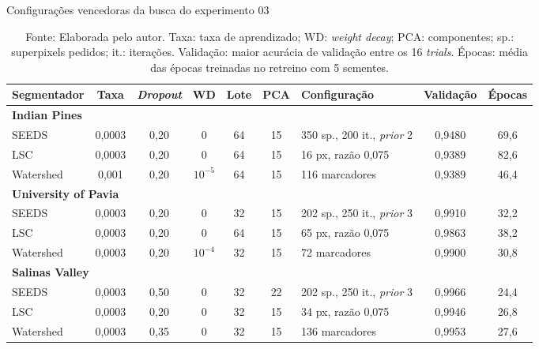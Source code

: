 \begin{table}[!htb]
    \centering
    \footnotesize
    \setlength{\tabcolsep}{3pt}
    \caption{Configurações vencedoras da busca do experimento 03}
    \begin{tabular}{|l|c|c|c|c|c|l|c|c|}
        \hline
        \rowcolor[HTML]{C0C0C0}
        \textbf{Segmentador} & \textbf{Taxa} & \textbf{\textit{Dropout}} & \textbf{WD} & \textbf{Lote} & \textbf{PCA} & \textbf{Configuração} & \textbf{Validação} & \textbf{Épocas} \\
        \hline
        \multicolumn{9}{|l|}{\cellcolor[HTML]{EFEFEF}\textbf{Indian Pines}} \\ \hline
        SEEDS & 0,0003 & 0,20 & 0 & 64 & 15 & 350 sp., 200 it., \textit{prior} 2 & 0,9480 & 69,6 \\
        LSC & 0,0003 & 0,20 & 0 & 64 & 15 & 16 px, razão 0,075 & 0,9389 & 82,6 \\
        Watershed & 0,001 & 0,20 & $10^{-5}$ & 64 & 15 & 116 marcadores & 0,9389 & 46,4 \\ \hline
        \multicolumn{9}{|l|}{\cellcolor[HTML]{EFEFEF}\textbf{University of Pavia}} \\ \hline
        SEEDS & 0,0003 & 0,20 & 0 & 32 & 15 & 202 sp., 250 it., \textit{prior} 3 & 0,9910 & 32,2 \\
        LSC & 0,0003 & 0,20 & 0 & 64 & 15 & 65 px, razão 0,075 & 0,9863 & 38,2 \\
        Watershed & 0,0003 & 0,20 & $10^{-4}$ & 32 & 15 & 72 marcadores & 0,9900 & 30,8 \\ \hline
        \multicolumn{9}{|l|}{\cellcolor[HTML]{EFEFEF}\textbf{Salinas Valley}} \\ \hline
        SEEDS & 0,0003 & 0,50 & 0 & 32 & 22 & 202 sp., 250 it., \textit{prior} 3 & 0,9966 & 24,4 \\
        LSC & 0,0003 & 0,20 & 0 & 32 & 15 & 34 px, razão 0,075 & 0,9946 & 26,8 \\
        Watershed & 0,0003 & 0,35 & 0 & 32 & 15 & 136 marcadores & 0,9953 & 27,6 \\ \hline
    \end{tabular}
    \captionsetup{justification=raggedright}
    \caption*{Fonte: Elaborada pelo autor. Taxa: taxa de aprendizado; WD: \textit{weight decay}; PCA: componentes; sp.: superpixels pedidos; it.: iterações. Validação: maior acurácia de validação entre os 16 \textit{trials}. Épocas: média das épocas treinadas no retreino com 5 sementes.}
    \label{tab:vencedores}
\end{table}

